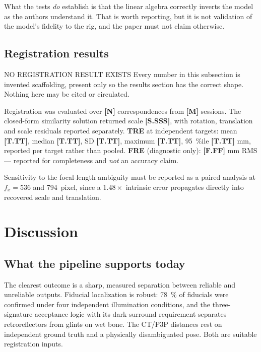 \documentclass[journal,10pt]{IEEEtran}
\newcommand{\TODO}[1]{\textcolor{todoRed}{\textbf{[#1]}}}
\begin{document}
What the tests \emph{do} establish is that the linear algebra correctly inverts
the model as the authors understand it. That is worth reporting, but it is not
validation of the model's fidelity to the rig, and the paper must not claim
otherwise.

\subsection{Registration results}\label{sec:regresults}
\begin{todobox}{NO REGISTRATION RESULT EXISTS}
Every number in this subsection is invented scaffolding, present only so the
results section has the correct shape. Nothing here may be cited or circulated.

Registration was evaluated over \TODO{N} correspondences from \TODO{M} sessions.
The closed-form similarity solution returned scale \TODO{S.SSS}, with rotation,
translation and scale residuals reported separately. \textbf{TRE} at independent
targets: mean \TODO{T.TT}, median \TODO{T.TT}, SD \TODO{T.TT}, maximum
\TODO{T.TT}, \SI{95}{\percent}ile \TODO{T.TT} mm, reported per target rather than
pooled. \textbf{FRE} (diagnostic only): \TODO{F.FF} mm RMS --- reported for
completeness and \emph{not} an accuracy claim.

Sensitivity to the focal-length ambiguity must be reported as a paired analysis
at $f_x = \num{536}$ and \SI{794}{pixel}, since a $1.48\times$ intrinsic error
propagates directly into recovered scale and translation.
\end{todobox}

\section{Discussion}

\subsection{What the pipeline supports today}
The clearest outcome is a sharp, measured separation between reliable and
unreliable outputs. Fiducial localization is robust: \SI{78}{\percent} of
fiducials were confirmed under four independent illumination conditions, and the
three-signature acceptance logic with its dark-surround requirement separates
retroreflectors from glints on wet bone. The CT/P3P distances rest on independent
ground truth and a physically disambiguated pose. Both are suitable registration
inputs.
\end{document}
